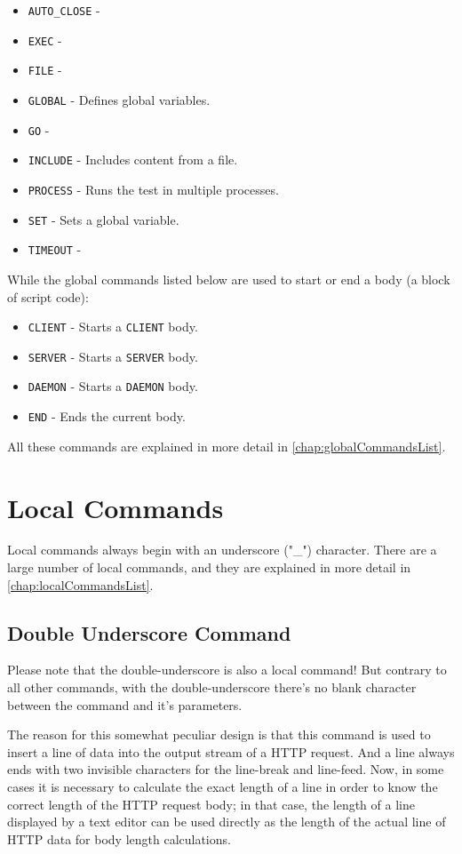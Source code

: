 \begin{itemize}
\item \texttt{AUTO\_CLOSE} - 
\item \texttt{EXEC} - 
\item \texttt{FILE} - 
\item \texttt{GLOBAL} - Defines global variables.
\item \texttt{GO} - 
\item \texttt{INCLUDE} - Includes content from a file.
\item \texttt{PROCESS} - Runs the test in multiple processes.
\item \texttt{SET} - Sets a global variable.
\item \texttt{TIMEOUT} - 
\end{itemize}

While the global commands listed below are used to start or end 
a body (a block of script code):

\begin{itemize}
\item \texttt{CLIENT} - Starts a \texttt{CLIENT} body.
\item \texttt{SERVER} - Starts a \texttt{SERVER} body.
\item \texttt{DAEMON} - Starts a \texttt{DAEMON} body.
\item \texttt{END} - Ends the current body.
\end{itemize}

All these commands are explained in more detail in \ref{chap:globalCommandsList}.


\newpage
\section{Local Commands}
\label{chap:localCommands}

Local commands always begin with an underscore ("\_") character. There are a 
large number of local commands, and they are explained in more detail in \ref{chap:localCommandsList}.

\subsection{Double Underscore Command} 

Please note that the double-underscore is also a local command! But contrary to 
all other commands, with the double-underscore there's no blank character between 
the command and it's parameters.

The reason for this somewhat peculiar design is that this command is used to 
insert a line of data into the output stream of a HTTP request. And a line always 
ends with two invisible characters for the line-break and line-feed. Now, in some 
cases it is necessary to calculate the exact length of a line in order to know the 
correct length of the HTTP request body; in that case, the length of a line 
displayed by a text editor can be used directly as the length of the actual line 
of HTTP data for body length calculations.
